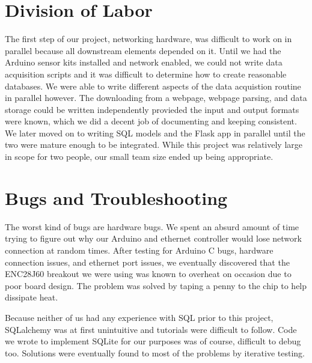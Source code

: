 \documentclass{article}
\begin{document}
\section*{Division of Labor}
\par The first step of our project, networking hardware, was difficult to work on in parallel because all downstream elements depended on it. Until we had the Arduino sensor kits installed and network enabled, we could not write data acquisition scripts and it was difficult to determine how to create reasonable databases. We were able to write different aspects of the data acquistion routine in parallel however. The downloading from a webpage, webpage parsing, and data storage could be written independently provieded the input and output formats were known, which we did a decent job of documenting and keeping consistent. We later moved on to writing SQL models and the Flask app in parallel until the two were mature enough to be integrated. While this project was relatively large in scope for two people, our small team size ended up being appropriate.

\section*{Bugs and Troubleshooting}
\par The worst kind of bugs are hardware bugs. We spent an absurd amount of time trying to figure out why our Arduino and ethernet controller would lose network connection at random times. After testing for Arduino C bugs, hardware connection issues, and ethernet port issues, we eventually discovered that the ENC28J60 breakout we were using was known to overheat on occasion due to poor board design. The problem was solved by taping a penny to the chip to help dissipate heat. 

\par Because neither of us had any experience with SQL prior to this project, SQLalchemy was at first unintuitive and tutorials were difficult to follow. Code we wrote to implement SQLite for our purposes was of course, difficult to debug too. Solutions were eventually found to most of the problems by iterative testing.

\end{document}
